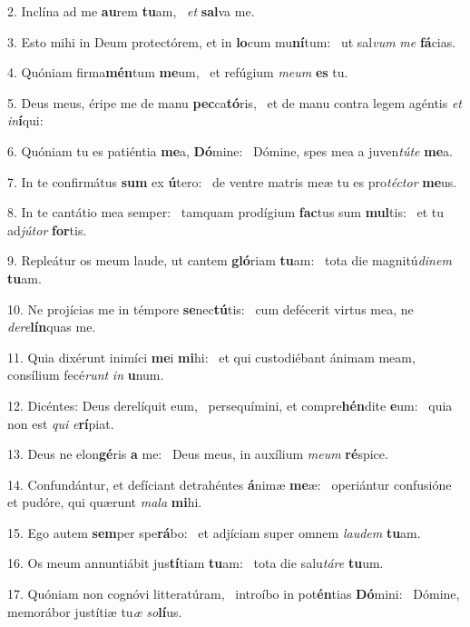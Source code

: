 2. Inclína ad me \textbf{au}rem \textbf{tu}am, \ast\  \textit{et} \textbf{sal}va me.\

3. Esto mihi in Deum protectórem, et in \textbf{lo}cum mu\textbf{ní}tum: \ast\  ut sal\textit{vum} \textit{me} \textbf{fá}cias.\

4. Quóniam firma\textbf{mén}tum \textbf{me}um, \ast\  et refúgium \textit{me}\textit{um} \textbf{es} tu.\

5. Deus meus, éripe me de manu \textbf{pec}ca\textbf{tó}ris, \ast\  et de manu contra legem agéntis \textit{et} \textit{in}\textbf{í}qui:\

6. Quóniam tu es patiéntia \textbf{me}a, \textbf{Dó}mine: \ast\  Dómine, spes mea a juven\textit{tú}\textit{te} \textbf{me}a.\

7. In te confirmátus \textbf{sum} ex \textbf{ú}tero: \ast\  de ventre matris meæ tu es pro\textit{téc}\textit{tor} \textbf{me}us.\

8. In te cantátio mea semper: \dag\  tamquam prodígium \textbf{fac}tus sum \textbf{mul}tis: \ast\  et tu ad\textit{jú}\textit{tor} \textbf{for}tis.\

9. Repleátur os meum laude, ut cantem \textbf{gló}riam \textbf{tu}am: \ast\  tota die magnitú\textit{di}\textit{nem} \textbf{tu}am.\

10. Ne projícias me in témpore \textbf{se}nec\textbf{tú}tis: \ast\  cum defécerit virtus mea, ne \textit{de}\textit{re}\textbf{lín}quas me.\

11. Quia dixérunt inimíci \textbf{me}i \textbf{mi}hi: \ast\  et qui custodiébant ánimam meam, consílium fecé\textit{runt} \textit{in} \textbf{u}num.\

12. Dicéntes: Deus derelíquit eum, \dag\  persequímini, et compre\textbf{hén}dite \textbf{e}um: \ast\  quia non est \textit{qui} \textit{e}\textbf{rí}piat.\

13. Deus ne elon\textbf{gé}ris \textbf{a} me: \ast\  Deus meus, in auxílium \textit{me}\textit{um} \textbf{ré}spice.\

14. Confundántur, et defíciant detrahéntes \textbf{á}nimæ \textbf{me}æ: \ast\  operiántur confusióne et pudóre, qui quærunt \textit{ma}\textit{la} \textbf{mi}hi.\

15. Ego autem \textbf{sem}per spe\textbf{rá}bo: \ast\  et adjíciam super omnem \textit{lau}\textit{dem} \textbf{tu}am.\

16. Os meum annuntiábit jus\textbf{tí}tiam \textbf{tu}am: \ast\  tota die salu\textit{tá}\textit{re} \textbf{tu}um.\

17. Quóniam non cognóvi litteratúram, \dag\  introíbo in pot\textbf{én}tias \textbf{Dó}mini: \ast\  Dómine, memorábor justítiæ tu\textit{æ} \textit{so}\textbf{lí}us.\


